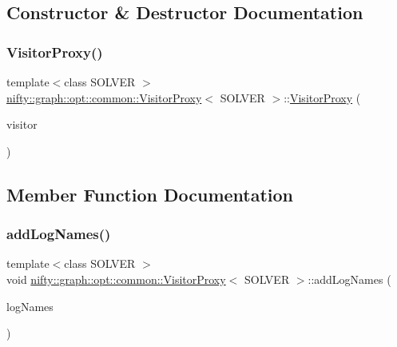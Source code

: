 \subsection{Constructor \& Destructor Documentation}
\mbox{\label{classnifty_1_1graph_1_1opt_1_1common_1_1VisitorProxy_a076951383b327e8e3cd50bad38020f5a}} 
\subsubsection{\texorpdfstring{Visitor\+Proxy()}{VisitorProxy()}}
{\footnotesize\ttfamily template$<$class S\+O\+L\+V\+ER $>$ \\
\hyperlink{classnifty_1_1graph_1_1opt_1_1common_1_1VisitorProxy}{nifty\+::graph\+::opt\+::common\+::\+Visitor\+Proxy}$<$ S\+O\+L\+V\+ER $>$\+::\hyperlink{classnifty_1_1graph_1_1opt_1_1common_1_1VisitorProxy}{Visitor\+Proxy} (\begin{DoxyParamCaption}\item[{\hyperlink{classnifty_1_1graph_1_1opt_1_1common_1_1VisitorProxy_a6828e049755dc2f473d15558c488e33b}{Visitor\+Base\+Tpe} $\ast$}]{visitor }\end{DoxyParamCaption})\hspace{0.3cm}{\ttfamily [inline]}}



\subsection{Member Function Documentation}
\mbox{\label{classnifty_1_1graph_1_1opt_1_1common_1_1VisitorProxy_a2511081cdc30c196f6d6da20773e3e28}} 
\subsubsection{\texorpdfstring{add\+Log\+Names()}{addLogNames()}}
{\footnotesize\ttfamily template$<$class S\+O\+L\+V\+ER $>$ \\
void \hyperlink{classnifty_1_1graph_1_1opt_1_1common_1_1VisitorProxy}{nifty\+::graph\+::opt\+::common\+::\+Visitor\+Proxy}$<$ S\+O\+L\+V\+ER $>$\+::add\+Log\+Names (\begin{DoxyParamCaption}\item[{std\+::initializer\+\_\+list$<$ std\+::string $>$}]{log\+Names }\end{DoxyParamCaption})\hspace{0.3cm}{\ttfamily [inline]}}

